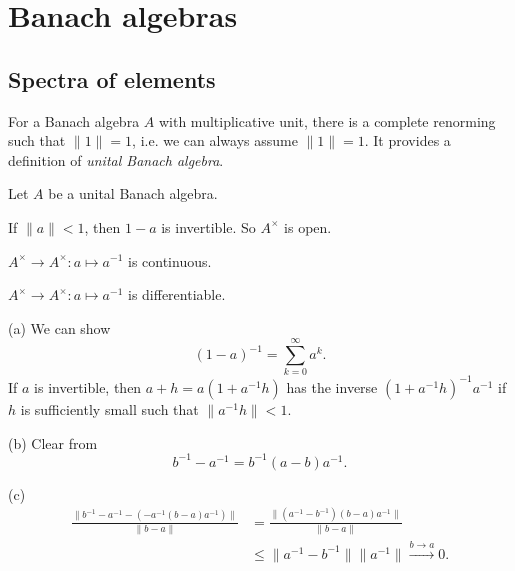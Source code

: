 \documentclass{../../large}
\begin{document}
\chapter{Banach algebras}

\section{Spectra of elements}

\begin{prb}
For a Banach algebra $A$ with multiplicative unit, there is a complete renorming such that $\|1\|=1$, i.e. we can always assume $\|1\|=1$.
It provides a definition of \emph{unital Banach algebra}.

Let $A$ be a unital Banach algebra.
\begin{parts}
\item If $\|a\|<1$, then $1-a$ is invertible. So $A^\times$ is open.
\item $A^\times\to A^\times:a\mapsto a^{-1}$ is continuous.
\item $A^\times\to A^\times:a\mapsto a^{-1}$ is differentiable.
\end{parts}
\end{prb}
\begin{pf}
(a)
We can show
\[(1-a)^{-1}=\sum_{k=0}^\infty a^k.\]
If $a$ is invertible, then $a+h=a(1+a^{-1}h)$ has the inverse $(1+a^{-1}h)^{-1}a^{-1}$ if $h$ is sufficiently small such that $\|a^{-1}h\|<1$.

(b)
Clear from
\[b^{-1}-a^{-1}=b^{-1}(a-b)a^{-1}.\]

(c)
\begin{align*}
\frac{\|b^{-1}-a^{-1}-(-a^{-1}(b-a)a^{-1})\|}{\|b-a\|}
&=\frac{\|(a^{-1}-b^{-1})(b-a)a^{-1}\|}{\|b-a\|}\\
&\le\|a^{-1}-b^{-1}\|\|a^{-1}\|\xrightarrow{b\to a}0.
\end{align*}
\end{pf}
\end{document}
